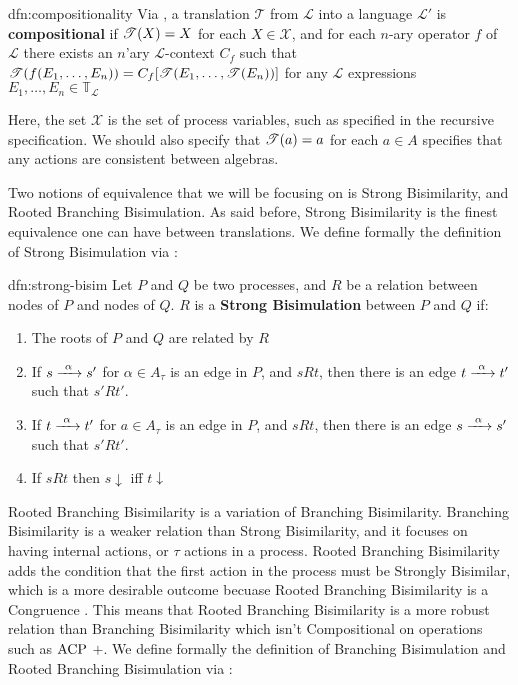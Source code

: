 \documentclass[../hons_project.tex]{subfiles}
\begin{document}
\begin{dfn}[Compositionality]{dfn:compositionality}{}
   Via \cite{DBLP:conf/fossacs/Glabbeek18}, a translation $\mathscr{T}$ from $\mathscr{L}$ into a language $\mathscr{L}'$ is \textbf{compositional} if $\mathscr{T}(X) = X$ for each $X\in \mathscr{X}$, and for each $n$-ary operator $f$ of $\mathscr{L}$ there exists an $n$'ary $\mathscr{L}$-context $C_{f}$ such that $\mathscr{T}(f(E_{1},\dots,E_{n})) = C_{f}[\mathscr{T}(E_{1},\dots,\mathscr{T}(E_{n}))]$ for any $\mathscr{L}$ expressions $E_{1},\dots,E_{n}\in \mathbb{T}_{\mathscr{L}}$
\end{dfn}

Here, the set $\mathscr{X}$ is the set of process variables, such as specified in the recursive specification. We should also specify that $\mathscr{T}(a) = a$ for each $a\in A$ specifies that any actions are consistent between algebras.


Two notions of equivalence that we will be focusing on is Strong Bisimilarity, and Rooted Branching Bisimulation. As said before, Strong Bisimilarity is the finest equivalence one can have between translations. We define formally the definition of Strong Bisimulation via \cite{baetenProcessAlgebra1990}:

\begin{dfn}{dfn:strong-bisim}{}
   Let $P$ and $Q$ be two processes, and $R$ be a relation between nodes of $P$ and nodes of $Q$. $R$ is a \textbf{Strong Bisimulation} between $P$ and $Q$ if:
   \begin{enumerate}
      \item The roots of $P$ and $Q$ are related by $R$
      \item If $s \prightarrow{\alpha} s'$ for $\alpha\in A_{\tau}$ is an edge in $P$, and $s R t$, then there is an edge $t \prightarrow{\alpha} t'$ such that $s' R t'$.
      \item If $t \prightarrow{\alpha} t'$ for $a\in A_{\tau}$ is an edge in $P$, and $s R t$, then there is an edge $s \prightarrow{\alpha} s'$ such that $s' R t'$.
      \item If $s R t$ then $s\downarrow$ iff $t \downarrow$
   \end{enumerate}
\end{dfn}

Rooted Branching Bisimilarity is a variation of Branching Bisimilarity. Branching Bisimilarity is a weaker relation than Strong Bisimilarity, and it focuses on having internal actions, or $\tau$ actions in a process. Rooted Branching Bisimilarity adds the condition that the first action in the process must be Strongly Bisimilar, which is a more desirable outcome becuase Rooted Branching Bisimilarity is a Congruence \citep{fokkinkRootedBranchingBisimulation2000}. This means that Rooted Branching Bisimilarity is a more robust relation than Branching Bisimilarity which isn't Compositional on operations such as $\mathrm{ACP}$ $+$. We define formally the definition of Branching Bisimulation and Rooted Branching Bisimulation via \cite{baetenProcessAlgebra1990}:
\end{document}

